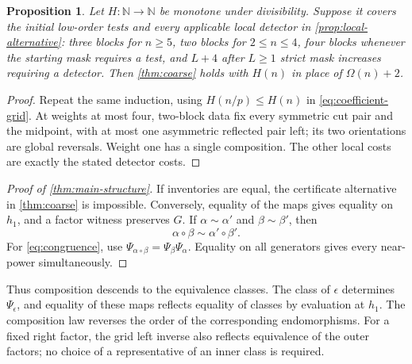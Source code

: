 \documentclass[11pt,a4paper]{amsart}
\numberwithin{equation}{section}
\theoremstyle{plain}
\newtheorem{proposition}[theorem]{Proposition}
\theoremstyle{definition}
\newcommand{\N}{\mathbb N}
\begin{document}
\begin{proposition}\label{prop:budget}
Let \(H:\N\to\N\) be monotone under divisibility.  Suppose it covers the
initial low-order tests and every applicable local detector in
\cref{prop:local-alternative}: three blocks for \(n\ge5\), two blocks for
\(2\le n\le4\), four blocks whenever the starting mask requires a test,
and \(L+4\) after \(L\ge1\) strict mask increases requiring a detector.
Then \cref{thm:coarse} holds with \(H(n)\) in place of
\(\Omega(n)+2\).
\end{proposition}
\begin{proof}
Repeat the same induction, using \(H(n/p)\le H(n)\) in
\eqref{eq:coefficient-grid}.  At weights at most four, two-block data
fix every symmetric cut pair and the midpoint, with at most one
asymmetric reflected pair left; its two orientations are global reversals.
Weight one has a single composition.  The other local costs are exactly
the stated detector costs.
\end{proof}

\begin{proof}[Proof of \cref{thm:main-structure}]
If inventories are equal, the certificate alternative in
\cref{thm:coarse} is impossible.  Conversely, equality of the maps gives
equality on \(h_1\), and a factor witness preserves \(G\).
If
\(\alpha\sim\alpha'\) and \(\beta\sim\beta'\), then
\begin{equation}\label{eq:congruence}
\alpha\circ\beta\sim\alpha'\circ\beta'.
\end{equation}
For \eqref{eq:congruence}, use
\(\Psi_{\alpha\circ\beta}=\Psi_\beta\Psi_\alpha\).
Equality on all generators gives every near-power simultaneously.
\end{proof}

Thus composition descends to the equivalence classes.  The class of
\(\epsilon\) determines \(\Psi_\epsilon\), and equality of these maps
reflects equality of classes by evaluation at \(h_1\).  The composition
law reverses the order of the corresponding endomorphisms.  For a fixed
right factor, the grid left inverse also reflects equivalence of the outer
factors; no choice of a representative of an inner class is required.
\end{document}

